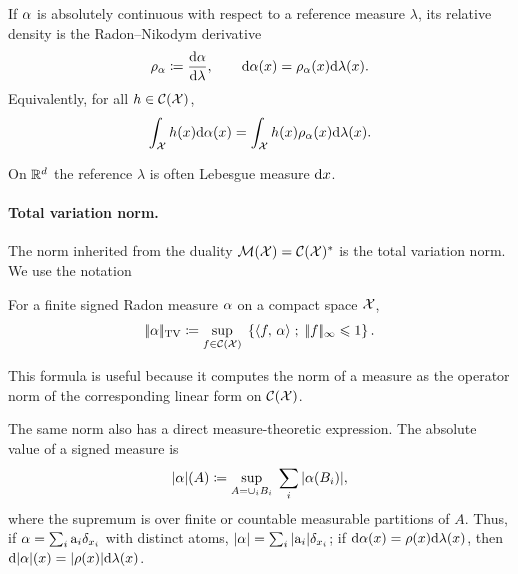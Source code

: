 \begin{defn}\label{def-relative-density}
	If $\alpha$ is absolutely continuous with respect to a reference measure $\lambda$, its relative density is the Radon--Nikodym derivative
	\[
		\rho_{\alpha}\coloneqq\frac{\mathrm{d}\alpha}{\mathrm{d}\lambda},
		\qquad
		\mathrm{d}\alpha(x)=\rho_{\alpha}(x)\mathrm{d}\lambda(x).
	\]
	Equivalently, for all $h\in\mathcal{C}(\mathcal{X})$,
	\[
		\int_{\mathcal{X}} h(x) \mathrm{d}\alpha(x) = \int_{\mathcal{X}} h(x) \rho_{\alpha}(x) \mathrm{d}\lambda(x).
	\]
\end{defn}
On $\mathbb{R}^d$ the reference $\lambda$ is often Lebesgue measure $\mathrm{d} x$.

\paragraph{Total variation norm.}

The norm inherited from the duality $\mathcal{M}(\mathcal{X})=\mathcal{C}(\mathcal{X})^*$ is the total variation norm. We use the notation
\begin{defn}\label{defn-total-variation}
	For a finite signed Radon measure $\alpha$ on a compact space $\mathcal{X}$,
	\[
		|\!| \alpha |\!|_{\operatorname{TV}}
		\coloneqq
		\underset{f \in \mathcal{C}(\mathcal{X})}{\sup}\; \left\{ \langle f,\,\alpha\rangle \;;\; |\!| f |\!|_\infty \leqslant 1 \right\}.
	\]
\end{defn}
This formula is useful because it computes the norm of a measure as the operator norm of the corresponding linear form on $\mathcal{C}(\mathcal{X})$.

The same norm also has a direct measure-theoretic expression. The absolute value of a signed measure is
\[
	|\alpha|(A)
	\coloneqq
	\underset{A=\cup_i B_i}{\sup}\; \sum_i |\alpha(B_i)|,
\]
where the supremum is over finite or countable measurable partitions of $A$. Thus, if $\alpha=\sum_i \mathrm{a}_i \delta_{x_i}$ with distinct atoms, $|\alpha|=\sum_i |\mathrm{a}_i|\delta_{x_i}$; if $\mathrm{d}\alpha(x)=\rho(x)\mathrm{d}\lambda(x)$, then $\mathrm{d}|\alpha|(x)=|\rho(x)|\mathrm{d}\lambda(x)$.

